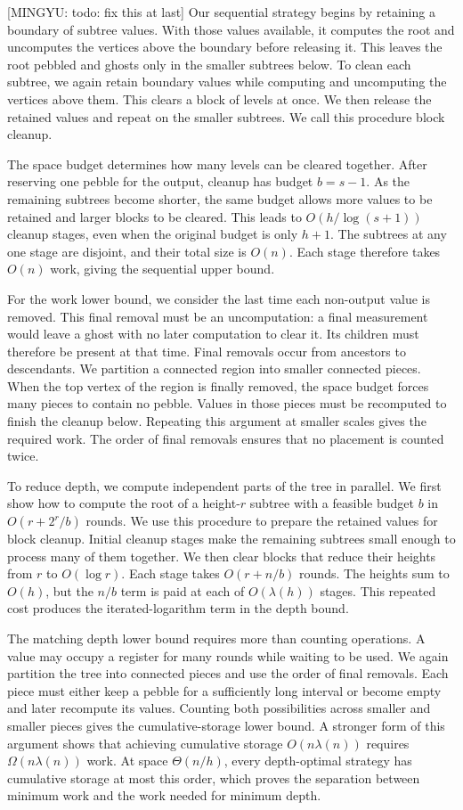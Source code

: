 \documentclass[11pt]{article}
\theoremstyle{definition}
\theoremstyle{remark}
\newcommand{\mingyu}[1]{{\color{magenta}\footnotesize [MINGYU: #1]}} %
\begin{document}
\mingyu{todo: fix this at last}
Our sequential strategy begins by retaining a boundary of subtree values. With those values available, it computes the root and uncomputes the vertices above the boundary before releasing it. This leaves the root pebbled and ghosts only in the smaller subtrees below. To clean each subtree, we again retain boundary values while computing and uncomputing the vertices above them. This clears a block of levels at once. We then release the retained values and repeat on the smaller subtrees. We call this procedure block cleanup.

The space budget determines how many levels can be cleared together. After reserving one pebble for the output, cleanup has budget $b=s-1$. As the remaining subtrees become shorter, the same budget allows more values to be retained and larger blocks to be cleared. This leads to $O(h/\log(s+1))$ cleanup stages, even when the original budget is only $h+1$. The subtrees at any one stage are disjoint, and their total size is $O(n)$. Each stage therefore takes $O(n)$ work, giving the sequential upper bound.

For the work lower bound, we consider the last time each non-output value is removed. This final removal must be an uncomputation: a final measurement would leave a ghost with no later computation to clear it. Its children must therefore be present at that time. Final removals occur from ancestors to descendants. We partition a connected region into smaller connected pieces. When the top vertex of the region is finally removed, the space budget forces many pieces to contain no pebble. Values in those pieces must be recomputed to finish the cleanup below. Repeating this argument at smaller scales gives the required work. The order of final removals ensures that no placement is counted twice.

To reduce depth, we compute independent parts of the tree in parallel. We first show how to compute the root of a height-$r$ subtree with a feasible budget $b$ in $O(r+2^r/b)$ rounds. We use this procedure to prepare the retained values for block cleanup. Initial cleanup stages make the remaining subtrees small enough to process many of them together. We then clear blocks that reduce their heights from $r$ to $O(\log r)$. Each stage takes $O(r+n/b)$ rounds. The heights sum to $O(h)$, but the $n/b$ term is paid at each of $O(\lambda(h))$ stages. This repeated cost produces the iterated-logarithm term in the depth bound.

The matching depth lower bound requires more than counting operations. A value may occupy a register for many rounds while waiting to be used. We again partition the tree into connected pieces and use the order of final removals. Each piece must either keep a pebble for a sufficiently long interval or become empty and later recompute its values. Counting both possibilities across smaller and smaller pieces gives the cumulative-storage lower bound. A stronger form of this argument shows that achieving cumulative storage $O(n\lambda(n))$ requires $\Omega(n\lambda(n))$ work. At space $\Theta(n/h)$, every depth-optimal strategy has cumulative storage at most this order, which proves the separation between minimum work and the work needed for minimum depth.
\end{document}
